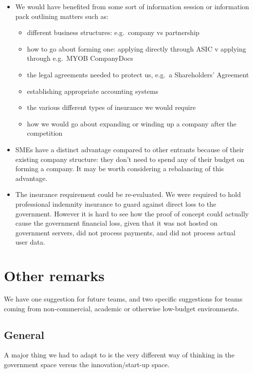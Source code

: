 \documentclass[12pt,a4paper,twosided]{article}
\begin{document}
\begin{itemize}
\item
  We would have benefited from some sort of information session or
  information pack outlining matters such as:
\begin{itemize}
\item 
  different business structures: e.g.~company vs partnership
\item
  how to go about forming one: applying directly through ASIC v applying
  through e.g.~MYOB CompanyDocs
\item
  the legal agreements needed to protect us, e.g.~a Shareholders'
  Agreement
\item
  establishing appropriate accounting systems
\item
  the various different types of insurance we would require
\item
  how we would go about expanding or winding up a company after the
  competition
\end{itemize}
\item
  SMEs have a distinct advantage compared to other entrants because of
  their existing company structure: they don't need to spend any of
  their budget on forming a company. It may be worth considering a rebalancing
  of this advantage.
\item
  The insurance requirement could be re-evaluated. We were required to
  hold professional indemnity insurance to guard against direct loss to
  the government. However it is hard to see how the proof of concept
  could actually cause the government financial loss, given that it was
  not hosted on government servers, did not process payments, and did
  not process actual user data.
\end{itemize}

\newpage
\section{Other remarks}

We have one suggestion for future teams, and two specific suggestions
for teams coming from non-commercial, academic or otherwise low-budget
environments.

\subsection{General}

A major thing we had to adapt to is the very different way of thinking
in the government space versus the innovation/start-up space.
\end{document}
